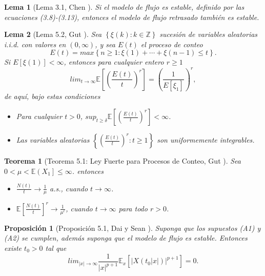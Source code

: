 \documentclass{article}
\newtheorem{Teo}{Teorema}[section]
\newtheorem{Prop}{Proposición}[section]
\newtheorem{Lema}{Lema}[section]
\newcommand{\ent}{\mathbb{Z}}
\newcommand{\esp}{\mathbb{E}}
\numberwithin{equation}{section}
\begin{document}
\begin{Lema}[Lema 3.1, Chen \cite{Chen}]\label{Lema3.1}
Si el modelo de flujo es estable, definido por las ecuaciones
(3.8)-(3.13), entonces el modelo de flujo retrasado tambi\'en es
estable.
\end{Lema}

\begin{Lema}[Lema 5.2, Gut \cite{Gut}]\label{Lema.5.2.Gut}
Sea $\left\{\xi\left(k\right):k\in\ent\right\}$ sucesi\'on de
variables aleatorias i.i.d. con valores en
$\left(0,\infty\right)$, y sea $E\left(t\right)$ el proceso de
conteo
\[E\left(t\right)=max\left\{n\geq1:\xi\left(1\right)+\cdots+\xi\left(n-1\right)\leq t\right\}.\]
Si $E\left[\xi\left(1\right)\right]<\infty$, entonces para
cualquier entero $r\geq1$
\begin{equation}
lim_{t\rightarrow\infty}\esp\left[\left(\frac{E\left(t\right)}{t}\right)^{r}\right]=\left(\frac{1}{E\left[\xi_{1}\right]}\right)^{r},
\end{equation}
de aqu\'i, bajo estas condiciones
\begin{itemize}
\item[a)] Para cualquier $t>0$,
$sup_{t\geq\delta}\esp\left[\left(\frac{E\left(t\right)}{t}\right)^{r}\right]<\infty$.

\item[b)] Las variables aleatorias
$\left\{\left(\frac{E\left(t\right)}{t}\right)^{r}:t\geq1\right\}$
son uniformemente integrables.
\end{itemize}
\end{Lema}

\begin{Teo}[Teorema 5.1: Ley Fuerte para Procesos de Conteo, Gut
\cite{Gut}]\label{Tma.5.1.Gut} Sea
$0<\mu<\esp\left(X_{1}\right]\leq\infty$. entonces

\begin{itemize}
\item[a)] $\frac{N\left(t\right)}{t}\rightarrow\frac{1}{\mu}$
a.s., cuando $t\rightarrow\infty$.


\item[b)]$\esp\left[\frac{N\left(t\right)}{t}\right]^{r}\rightarrow\frac{1}{\mu^{r}}$,
cuando $t\rightarrow\infty$ para todo $r>0$.
\end{itemize}
\end{Teo}


\begin{Prop}[Proposici\'on 5.1, Dai y Sean \cite{DaiSean}]\label{Prop.5.1}
Suponga que los supuestos (A1) y (A2) se cumplen, adem\'as suponga
que el modelo de flujo es estable. Entonces existe $t_{0}>0$ tal
que
\begin{equation}\label{Eq.Prop.5.1}
lim_{|x|\rightarrow\infty}\frac{1}{|x|^{p+1}}\esp_{x}\left[|X\left(t_{0}|x|\right)|^{p+1}\right]=0.
\end{equation}

\end{Prop}
\end{document}

